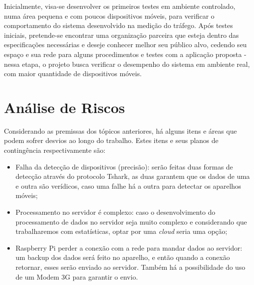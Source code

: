 Inicialmente, visa-se desenvolver os primeiros testes em ambiente
controlado, numa área pequena e com poucos dispositivos móveis, para verificar o
comportamento do sistema desenvolvido na medição do tráfego. Após testes
iniciais, pretende-se encontrar uma organização parceira que esteja dentro das
especificações necessárias e deseje conhecer melhor seu público alvo, cedendo
seu espaço e sua rede para alguns procedimentos e testes com a aplicação proposta
 - nessa etapa, o projeto busca verificar o desempenho do
sistema em ambiente real, com maior quantidade de dispositivos móveis.

\section{Análise de Riscos}
Considerando as premissas dos tópicos anteriores, há alguns itens e áreas que podem sofrer desvios ao longo do trabalho. Estes itens e seus planos
de contingência respectivamente são:

\begin{itemize}
  \item Falha da detecção de dispositivos (precisão): serão feitas duas formas de detecção através do protocolo Tshark, as duas garantem que os dados
  de uma e outra são verídicos, caso uma falhe há a outra para detectar os aparelhos móveis;
  \item Processamento no servidor é complexo: caso o desenvolvimento do processamento de dados no servidor seja muito complexo e considerando
  que trabalharemos com estatísticas, optar por uma \emph{cloud} seria uma opção;
  \item Raspberry Pi perder a conexão com a rede para mandar dados ao servidor: um backup dos dados será feito no aparelho, e então quando
  a conexão retornar, esses serão enviado ao servidor. Também há a possibilidade do uso de um Modem 3G para garantir o envio.
\end{itemize}
